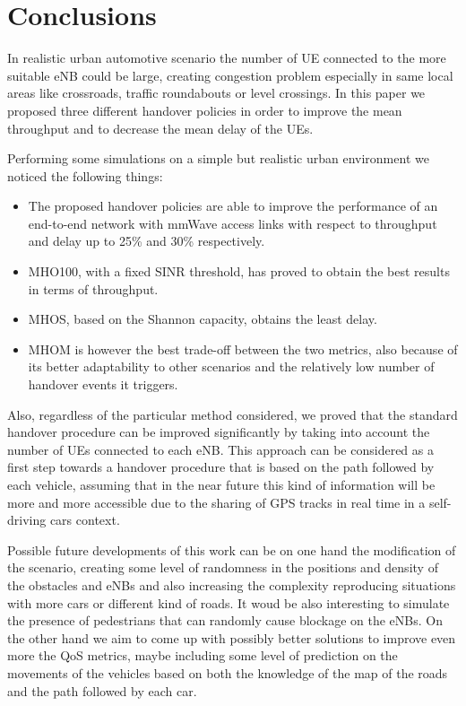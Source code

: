 \documentclass[conference,10pt]{IEEEtran}
\begin{document}
\section{Conclusions}\label{sec:conclusion}

In realistic urban automotive scenario the number of UE connected to the more suitable eNB could be large, creating congestion problem especially in same local areas like crossroads, traffic roundabouts or level crossings. In this paper we proposed three different handover policies in order to improve the mean throughput and to decrease the mean delay of the UEs.

 Performing some simulations on a simple but realistic urban environment we noticed the following things:
\begin{itemize}
\item The proposed handover policies are able to improve the performance of an end-to-end network with mmWave access links with respect to throughput and delay up to 25\% and 30\% respectively.
\item MHO100, with a fixed SINR threshold, has proved to obtain the best results in terms of throughput.
\item MHOS, based on the Shannon capacity, obtains the least delay.
\item MHOM is however the best trade-off between the two metrics, also because of its better adaptability to other scenarios and the relatively low number of handover events it triggers.
\end{itemize}

Also, regardless of the particular method considered, we proved that the standard handover procedure can be improved significantly by taking into account the number of UEs connected to each eNB. This approach can be considered as a first step towards a handover procedure that is based on the path followed by each vehicle, assuming that in the near future this kind of information will be more and more accessible due to the sharing of GPS tracks in real time in a self-driving cars context. 

Possible future developments of this work can be on one hand the modification of the scenario, creating some level of randomness in the positions and density of the obstacles and eNBs and also increasing the complexity reproducing situations with more cars or different kind of roads. It woud be also interesting to simulate the presence of pedestrians that can randomly cause blockage on the eNBs. 
On the other hand we aim to come up with possibly better solutions to improve even more the QoS metrics, maybe including some level of prediction on the movements of the vehicles based on both the knowledge of the map of the roads and the path followed by each car.
\end{document}
